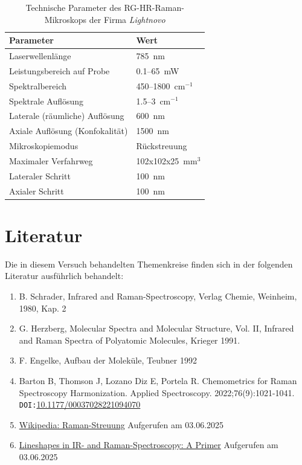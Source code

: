 \begin{table}[H]
    \centering
    \caption{Technische Parameter des RG-HR-Raman-Mikroskops der Firma \textit{Lightnovo}}
    \begin{tabular}{l|l}
        \textbf{Parameter}                & \textbf{Wert}        \\
        \hline
        Laserwellenlänge                  & 785~nm                        \\
        Leistungsbereich auf Probe        & 0.1--65~mW                  \\
        Spektralbereich                   & 450--1800~cm$^{-1}$       \\
        Spektrale Auflösung               & 1.5--3~cm$^{-1}$        \\
        Laterale (räumliche) Auflösung    & 600~nm                        \\
        Axiale Auflösung (Konfokalität)   & 1500~nm                       \\
        Mikroskopiemodus                  & Rückstreuung            \\
        Maximaler Verfahrweg              & 102x102x25~mm$^3$ \\
        Lateraler Schritt                 & 100~nm                        \\
        Axialer Schritt                   & 100~nm        \\
        \hline                
    \end{tabular}
    \label{tab:785nm-parameter}
\end{table}

\clearpage
\section{Literatur}
Die in diesem Versuch behandelten Themenkreise finden sich in der folgenden Literatur ausführlich behandelt:
\begin{enumerate}
    \item B. Schrader, Infrared and Raman-Spectroscopy, Verlag Chemie, Weinheim, 1980, Kap. 2
    \item G. Herzberg, Molecular Spectra and Molecular Structure, Vol. II, Infrared and Raman Spectra of Polyatomic Molecules, Krieger 1991.
    \item F. Engelke, Aufbau der Moleküle, Teubner 1992
    \item Barton B, Thomson J, Lozano Diz E, Portela R. Chemometrics for Raman Spectroscopy Harmonization. Applied Spectroscopy. 2022;76(9):1021-1041.\\
    \texttt{DOI:}\href{https://www.doi.org/10.1177/00037028221094070}{10.1177/00037028221094070}
    \item \href{https://de.wikipedia.org/wiki/Raman-Streuung}{Wikipedia: Raman-Streuung} Aufgerufen am 03.06.2025
    \item \href{https://www.spectroscopyonline.com/view/lineshapes-ir-and-raman-spectroscopy-primer}{Lineshapes in IR- and Raman-Spectroscopy: A Primer} Aufgerufen am 03.06.2025
\end{enumerate}